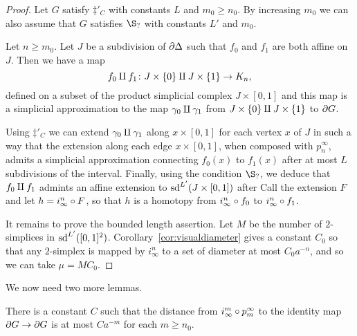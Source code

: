 \documentclass[a4paper]{article}
\begin{document}
\begin{proof}
  Let $G$ satisfy $\ddag'_C$ with constants $L$ and $m_0 \geq n_0$.
  By increasing $m_0$ we can also assume that $G$ satisfies $\S_?$ with
  constants $L'$ and $m_0$.

  Let $n \geq m_0$.  Let $J$ be a subdivision of $\partial\Delta$ such
  that $f_0$ and $f_1$ are both affine on $J$. Then we have a map 
  \begin{equation*}
    f_0 \amalg f_1 \colon J \times \{0\} \amalg J \times \{1\}
          \to K_n,
  \end{equation*}
  defined on a subset of the product simplicial complex $J \times [0,1]$ and
  this map is a simplicial approximation to the map $\gamma_0 \amalg
  \gamma_1$ from $J\times\{0\} \amalg J \times\{1\}$ to $\partial G$. 
  
  Using $\ddag'_C$ we can extend $\gamma_0\amalg\gamma_1$ along $x
  \times [0,1]$ for each vertex $x$ of $J$ in such a way that the extension
  along each edge $x\times [0,1]$, when composed with $p^\infty_n$, admits a
  simplicial approximation connecting $f_0(x)$ to $f_1(x)$ after at most $L$
  subdivisions of the interval. Finally, using the condition $\S_?$, we deduce
  that $f_0 \amalg f_1$ admints an affine extension to $\operatorname{sd}^{L'}(J
  \times [0,1])$ after Call the extension $F$ and let $h = i^n_\infty \circ
  F$, so that $h$ is a homotopy from $i^n_\infty\circ f_0$ to
  $i^n_\infty\circ f_1$. 
  
  It remains to prove the bounded length assertion.  Let $M$ be the number of
  $2$-simplices in $\operatorname{sd}^{L'}([0,1]^2)$.  Corollary~\ref{cor:visualdiameter}
  gives a constant $C_0$ so that any $2$-simplex is mapped by $i^n_\infty$ to a
  set of diameter at most $C_0 a^{-n}$, and so we can take $\mu = MC_0$.
\end{proof}

We now need two more lemmas.

\begin{lemma}\label{lem:convergestoidentity}
  There is a constant $C$ such that the distance from $i^m_\infty \circ 
  p^\infty_m$ to the identity map $\partial G\to\partial G$ is at most 
  $Ca^{-m}$ for each $m \geq n_0$.
\end{lemma}
\end{document}
